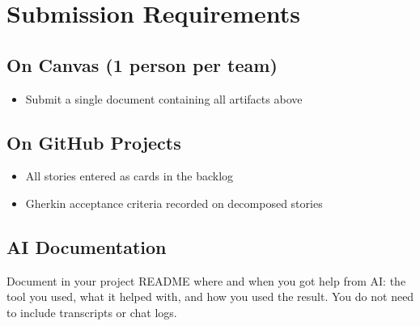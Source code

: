 \documentclass[11pt]{article}
\begin{document}
\section{Submission Requirements}

\subsection*{On Canvas (1 person per team)}
\begin{itemize}
    \item Submit a single document containing all artifacts above
\end{itemize}

\subsection*{On GitHub Projects}
\begin{itemize}
    \item All stories entered as cards in the backlog
    \item Gherkin acceptance criteria recorded on decomposed stories
\end{itemize}

\subsection*{AI Documentation}
Document in your project README where and when you got help from AI: the tool you used, what it helped with, and how you used the result. You do not need to include transcripts or chat logs.
\end{document}

